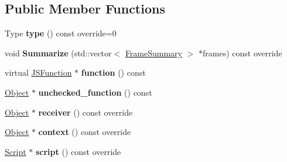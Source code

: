 \subsection*{Public Member Functions}
\begin{DoxyCompactItemize}
\item 
\mbox{\label{classv8_1_1internal_1_1JavaScriptFrame_a0e308f31621f806b77fe6290d680ef81}} 
Type {\bfseries type} () const override=0
\item 
\mbox{\label{classv8_1_1internal_1_1JavaScriptFrame_a0937c6b32623e0dcc1d839c36d082132}} 
void {\bfseries Summarize} (std\+::vector$<$ \mbox{\hyperlink{classv8_1_1internal_1_1FrameSummary}{Frame\+Summary}} $>$ $\ast$frames) const override
\item 
\mbox{\label{classv8_1_1internal_1_1JavaScriptFrame_ac9864eab8e333fc72eba94e1c6c18469}} 
virtual \mbox{\hyperlink{classv8_1_1internal_1_1JSFunction}{J\+S\+Function}} $\ast$ {\bfseries function} () const
\item 
\mbox{\label{classv8_1_1internal_1_1JavaScriptFrame_a9ccad9e21d94731675e1393b3a754545}} 
\mbox{\hyperlink{classv8_1_1internal_1_1Object}{Object}} $\ast$ {\bfseries unchecked\+\_\+function} () const
\item 
\mbox{\label{classv8_1_1internal_1_1JavaScriptFrame_a75c15db7564b1adb51917399922f1ae2}} 
\mbox{\hyperlink{classv8_1_1internal_1_1Object}{Object}} $\ast$ {\bfseries receiver} () const override
\item 
\mbox{\label{classv8_1_1internal_1_1JavaScriptFrame_aadfec5e7391da589ffc39ac2324486d7}} 
\mbox{\hyperlink{classv8_1_1internal_1_1Object}{Object}} $\ast$ {\bfseries context} () const override
\item 
\mbox{\label{classv8_1_1internal_1_1JavaScriptFrame_a28e7098a42fb581adccb5ed8a99f2b6c}} 
\mbox{\hyperlink{classv8_1_1internal_1_1Script}{Script}} $\ast$ {\bfseries script} () const override
\item 
\mbox{\label{classv8_1_1internal_1_1JavaScriptFrame_a425d98c0b980f47ce7e2f9075b62bcab}} 

\end{DoxyCompactItemize}
